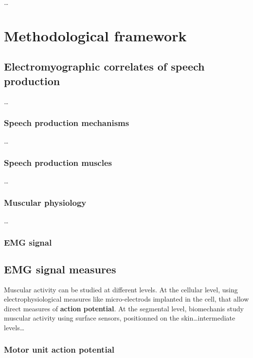 \documentclass[a4paper,12pt,oneside,oldfontcommands]{memoir}
\begin{document}
\ldots{}

\chapter{Methodological framework}\label{methodological-framework}

\section{Electromyographic correlates of speech
production}\label{electromyographic-correlates-of-speech-production}

\ldots{}

\subsection{Speech production
mechanisms}\label{speech-production-mechanisms}

\ldots{}

\subsection{Speech production muscles}\label{speech-production-muscles}

\ldots{}

\subsection{Muscular physiology}\label{muscular-physiology}

\ldots{}

\subsection{EMG signal}\label{emg-signal}

\section{EMG signal measures}\label{emg-signal-measures}

Muscular activity can be studied at different levels. At the cellular
level, using electrophysiological measures like micro-electrods
implanted in the cell, that allow direct measures of \textbf{action
potential}. At the segmental level, biomechanis study muscular activity
using surface sensors, positionned on the skin\ldots{}intermediate
levels\ldots{}

\subsection{Motor unit action
potential}\label{motor-unit-action-potential}
\end{document}
